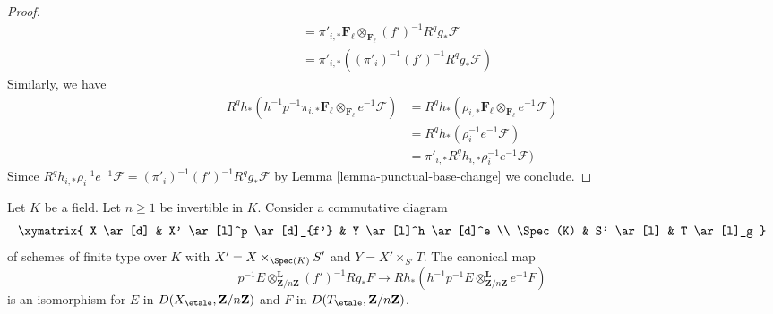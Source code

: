 \begin{proof}
\begin{align*}
& =
\pi'_{i, *}\mathbf{F}_\ell
\otimes_{\mathbf{F}_\ell} (f')^{-1}R^qg_*\mathcal{F} \\
& =
\pi'_{i, *}((\pi'_i)^{-1} (f')^{-1}R^qg_*\mathcal{F})
\end{align*}
Similarly, we have
\begin{align*}
R^qh_*(h^{-1}p^{-1} \pi_{i, *}\mathbf{F}_\ell
\otimes_{\mathbf{F}_\ell} e^{-1}\mathcal{F})
& =
R^qh_*(\rho_{i, *}\mathbf{F}_\ell
\otimes_{\mathbf{F}_\ell} e^{-1}\mathcal{F}) \\
& =
R^qh_*(\rho_i^{-1}e^{-1}\mathcal{F}) \\
& =
\pi'_{i, *}R^qh_{i, *} \rho_i^{-1}e^{-1}\mathcal{F})
\end{align*}
Simce
$R^qh_{i, *} \rho_i^{-1}e^{-1}\mathcal{F} = 
(\pi'_i)^{-1} (f')^{-1}R^qg_*\mathcal{F}$ by
Lemma \ref{lemma-punctual-base-change}
we conclude.
\end{proof}

\begin{lemma}
\label{lemma-punctual-base-change-upgrade-unbounded}
Let $K$ be a field. Let $n \geq 1$ be invertible in $K$.
Consider a commutative diagram
$$
\xymatrix{
X \ar[d] & X' \ar[l]^p \ar[d]_{f'} & Y \ar[l]^h \ar[d]^e \\
\Spec(K) & S' \ar[l] & T \ar[l]_g
}
$$
of schemes of finite type over $K$ with
$X' = X \times_{\Spec(K)} S'$ and $Y = X' \times_{S'} T$.
The canonical map
$$
p^{-1}E \otimes_{\mathbf{Z}/n\mathbf{Z}}^\mathbf{L} (f')^{-1}Rg_*F
\longrightarrow
Rh_*(h^{-1}p^{-1}E \otimes_{\mathbf{Z}/n\mathbf{Z}}^\mathbf{L} e^{-1}F)
$$
is an isomorphism for $E$ in $D(X_\etale, \mathbf{Z}/n\mathbf{Z})$
and $F$ in $D(T_\etale, \mathbf{Z}/n\mathbf{Z})$.
\end{lemma}

